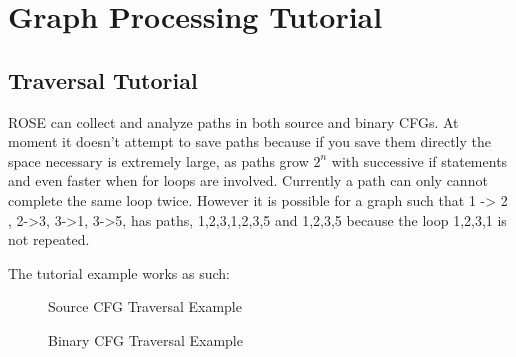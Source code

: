 \chapter{Graph Processing Tutorial}

\section{Traversal Tutorial}
ROSE can collect and analyze paths in both source and binary CFGs. At moment it doesn't attempt to save paths because if
you save them directly the space necessary is extremely large, as paths grow $2^n$ with successive if statements and even faster
when for loops are involved. Currently a path can only cannot complete the same loop twice. However it is possible for a graph
such that 1 -> 2 , 2->3, 3->1, 3->5, has paths, 1,2,3,1,2,3,5 and 1,2,3,5 because the loop 1,2,3,1 is not repeated.

The tutorial example works as such:
\begin{figure}[!h]
{\indent
{\mySmallFontSize

\begin{latexonly}
   
\end{latexonly}

\begin{htmlonly}
   
\end{htmlonly}

}
}
\caption{Source CFG Traversal Example}
\label{Tutorial:sourceTraversalTutorial}
\end{figure}

\begin{figure}[!h]
{\indent
{\mySmallFontSize

\begin{latexonly}
   
\end{latexonly}

\begin{htmlonly}
   
\end{htmlonly}

}
}
\caption{Binary CFG Traversal Example}
\label{Tutorial:binaryTraversalTutorial}
\end{figure}
